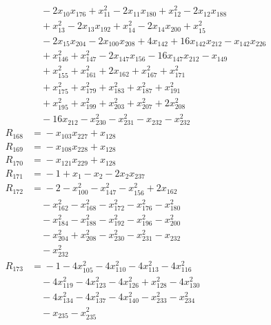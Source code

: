 \begin{align*}
&\quad{} -2x_{10}x_{176} +x_{11}^{2} -2x_{11}x_{180} +x_{12}^{2} -2x_{12}x_{188} \\
&\quad{} +x_{13}^{2} -2x_{13}x_{192} +x_{14}^{2} -2x_{14}x_{200} +x_{15}^{2} \\
&\quad{} -2x_{15}x_{204} -2x_{100}x_{208} +4x_{142} +16x_{142}x_{212} -x_{142}x_{226} \\
&\quad{} +x_{146}^{2} +x_{147}^{2} -2x_{147}x_{156} -16x_{147}x_{212} -x_{149} \\
&\quad{} +x_{155}^{2} +x_{161}^{2} +2x_{162} +x_{167}^{2} +x_{171}^{2} \\
&\quad{} +x_{175}^{2} +x_{179}^{2} +x_{183}^{2} +x_{187}^{2} +x_{191}^{2} \\
&\quad{} +x_{195}^{2} +x_{199}^{2} +x_{203}^{2} +x_{207}^{2} +2x_{208}^{2} \\
&\quad{} -16x_{212} -x_{230}^{2} -x_{231}^{2} -x_{232} -x_{232}^{2} \\
R_{168} &={} -x_{103}x_{227} +x_{128} \\
R_{169} &={} -x_{108}x_{228} +x_{128} \\
R_{170} &={} -x_{121}x_{229} +x_{128} \\
R_{171} &={} -1 +x_{1} -x_{2} -2x_{2}x_{237} \\
R_{172} &={} -2 -x_{100}^{2} -x_{147}^{2} -x_{156}^{2} +2x_{162} \\
&\quad{} -x_{162}^{2} -x_{168}^{2} -x_{172}^{2} -x_{176}^{2} -x_{180}^{2} \\
&\quad{} -x_{184}^{2} -x_{188}^{2} -x_{192}^{2} -x_{196}^{2} -x_{200}^{2} \\
&\quad{} -x_{204}^{2} +x_{208}^{2} -x_{230}^{2} -x_{231}^{2} -x_{232} \\
&\quad{} -x_{232}^{2} \\
R_{173} &={} -1 -4x_{105}^{2} -4x_{110}^{2} -4x_{113}^{2} -4x_{116}^{2} \\
&\quad{} -4x_{119}^{2} -4x_{123}^{2} -4x_{126}^{2} +x_{128}^{2} -4x_{130}^{2} \\
&\quad{} -4x_{134}^{2} -4x_{137}^{2} -4x_{140}^{2} -x_{233}^{2} -x_{234}^{2} \\
&\quad{} -x_{235} -x_{235}^{2} \\
\end{align*}
\endgroup
